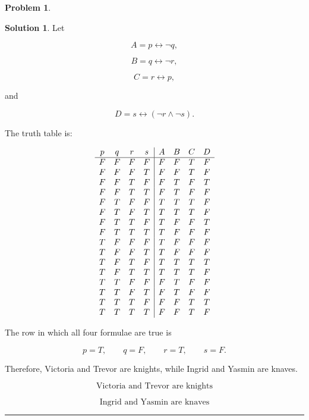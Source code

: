 \documentclass{article}
\theoremstyle{definition}
\newtheorem{problem}{Problem}
\def\fline{\rule{0.75\linewidth}{0.5pt}}
\newcommand{\finishline}{\begin{center}\fline\end{center}}
\newtheorem*{solution*}{Solution}
\newenvironment{solution}{\begin{solution*}}{{\finishline} \end{solution*}}
\begin{document}
\begin{problem}
\begin{enumerate}[label=(\alph*)]
\begin{solution}
        Let

        \[
        A = p \leftrightarrow \neg q,
        \]

        \[
        B = q \leftrightarrow \neg r,
        \]

        \[
        C = r \leftrightarrow p,
        \]

        and

        \[
        D = s \leftrightarrow (\neg r \land \neg s).
        \]

        The truth table is:

        \[
        \begin{array}{c c c c|c c c c}
        p&q&r&s&A&B&C&D\\
        \hline
        F&F&F&F&F&F&T&F\\
        F&F&F&T&F&F&T&F\\
        F&F&T&F&F&T&F&T\\
        F&F&T&T&F&T&F&F\\
        F&T&F&F&T&T&T&F\\
        F&T&F&T&T&T&T&F\\
        F&T&T&F&T&F&F&T\\
        F&T&T&T&T&F&F&F\\
        T&F&F&F&T&F&F&F\\
        T&F&F&T&T&F&F&F\\
        T&F&T&F&T&T&T&T\\
        T&F&T&T&T&T&T&F\\
        T&T&F&F&F&T&F&F\\
        T&T&F&T&F&T&F&F\\
        T&T&T&F&F&F&T&T\\
        T&T&T&T&F&F&T&F
        \end{array}
        \]

        The row in which all four formulae are true is

        \[
        p=T,\qquad q=F,\qquad r=T,\qquad s=F.
        \]

        Therefore, Victoria and Trevor are knights, while Ingrid and
        Yasmin are knaves.

        \[
        \boxed{\text{Victoria and Trevor are knights}}
        \]

        \[
        \boxed{\text{Ingrid and Yasmin are knaves}}
        \]

    \end{solution}
\end{enumerate}


\end{problem}
\end{document}
